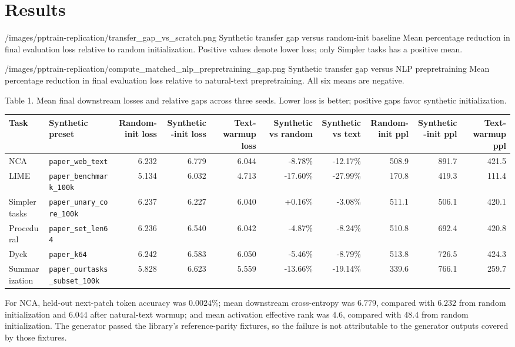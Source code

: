 \documentclass[11pt]{article}
\begin{document}
\section{Results}\label{results}

  {/images/pptrain-replication/transfer_gap_vs_scratch.png}
  {Synthetic transfer gap versus random-init baseline}
  {Mean percentage reduction in final evaluation loss relative to random initialization. Positive values denote lower loss; only Simpler tasks has a positive mean.}

  {/images/pptrain-replication/compute_matched_nlp_prepretraining_gap.png}
  {Synthetic transfer gap versus NLP prepretraining}
  {Mean percentage reduction in final evaluation loss relative to natural-text prepretraining. All six means are negative.}

Table 1. Mean final downstream losses and relative gaps across three seeds. Lower loss is better; positive gaps favor synthetic initialization.

\begin{tabular}{@{}llrrrrrrrr@{}}
\toprule
Task & Synthetic preset & Random-init loss & Synthetic-init loss & Text-warmup loss & Synthetic vs random & Synthetic vs text & Random-init ppl & Synthetic-init ppl & Text-warmup ppl \\
\midrule
NCA & \texttt{paper\_web\_text} & 6.232 & 6.779 & 6.044 & -8.78\% & -12.17\% & 508.9 & 891.7 & 421.5 \\
LIME & \texttt{paper\_benchmark\_100k} & 5.134 & 6.032 & 4.713 & -17.60\% & -27.99\% & 170.8 & 419.3 & 111.4 \\
Simpler tasks & \texttt{paper\_unary\_core\_100k} & 6.237 & 6.227 & 6.040 & +0.16\% & -3.08\% & 511.1 & 506.1 & 420.1 \\
Procedural & \texttt{paper\_set\_len64} & 6.236 & 6.540 & 6.042 & -4.87\% & -8.24\% & 510.8 & 692.4 & 420.8 \\
Dyck & \texttt{paper\_k64} & 6.242 & 6.583 & 6.050 & -5.46\% & -8.79\% & 513.8 & 726.5 & 424.3 \\
Summarization & \texttt{paper\_ourtasks\_subset\_100k} & 5.828 & 6.623 & 5.559 & -13.66\% & -19.14\% & 339.6 & 766.1 & 259.7 \\
\bottomrule
\end{tabular}

For NCA, held-out next-patch token accuracy was \(0.0024\%\); mean downstream cross-entropy was \(6.779\), compared with \(6.232\) from random initialization and \(6.044\) after natural-text warmup; and mean activation effective rank was \(4.6\), compared with \(48.4\) from random initialization. The generator passed the library's reference-parity fixtures, so the failure is not attributable to the generator outputs covered by those fixtures.
\end{document}
